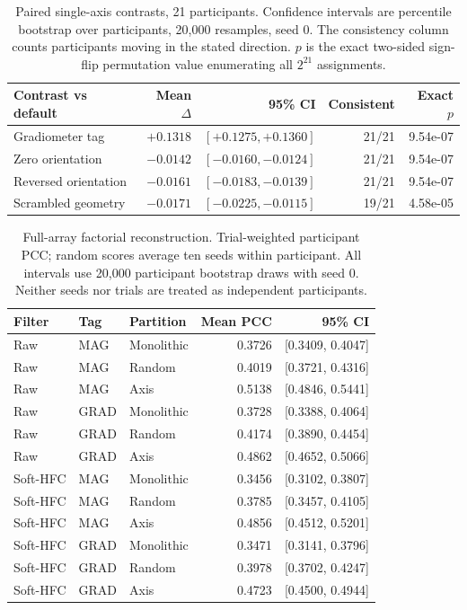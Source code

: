 \begin{table}[htbp]\centering\small
\begin{tabular}{lrrrr}
\toprule
Contrast vs default & Mean $\Delta$ & 95\% CI & Consistent & Exact $p$ \\
\midrule
Gradiometer tag & $+0.1318$ & $[+0.1275, +0.1360]$ & 21/21 & 9.54e-07 \\
Zero orientation & $-0.0142$ & $[-0.0160, -0.0124]$ & 21/21 & 9.54e-07 \\
Reversed orientation & $-0.0161$ & $[-0.0183, -0.0139]$ & 21/21 & 9.54e-07 \\
Scrambled geometry & $-0.0171$ & $[-0.0225, -0.0115]$ & 19/21 & 4.58e-05 \\
\bottomrule\end{tabular}
\caption{Paired single-axis contrasts, 21 participants. Confidence intervals are percentile bootstrap over participants, 20{,}000 resamples, seed 0. The consistency column counts participants moving in the stated direction. $p$ is the exact two-sided sign-flip permutation value enumerating all $2^{21}$ assignments.}
\label{tab:s-single-contrasts}\end{table}

\begin{table}[htbp]\centering\small
\begin{tabular}{lllrr}
\toprule
Filter & Tag & Partition & Mean PCC & 95\% CI \\
\midrule
Raw & MAG & Monolithic & 0.3726 & [0.3409, 0.4047] \\
Raw & MAG & Random & 0.4019 & [0.3721, 0.4316] \\
Raw & MAG & Axis & 0.5138 & [0.4846, 0.5441] \\
Raw & GRAD & Monolithic & 0.3728 & [0.3388, 0.4064] \\
Raw & GRAD & Random & 0.4174 & [0.3890, 0.4454] \\
Raw & GRAD & Axis & 0.4862 & [0.4652, 0.5066] \\
Soft-HFC & MAG & Monolithic & 0.3456 & [0.3102, 0.3807] \\
Soft-HFC & MAG & Random & 0.3785 & [0.3457, 0.4105] \\
Soft-HFC & MAG & Axis & 0.4856 & [0.4512, 0.5201] \\
Soft-HFC & GRAD & Monolithic & 0.3471 & [0.3141, 0.3796] \\
Soft-HFC & GRAD & Random & 0.3978 & [0.3702, 0.4247] \\
Soft-HFC & GRAD & Axis & 0.4723 & [0.4500, 0.4944] \\
\bottomrule\end{tabular}
\caption{Full-array factorial reconstruction. Trial-weighted participant PCC; random scores average ten seeds within participant. All intervals use 20{,}000 participant bootstrap draws with seed 0. Neither seeds nor trials are treated as independent participants.}
\label{tab:s-factorial-cohort}\end{table}

